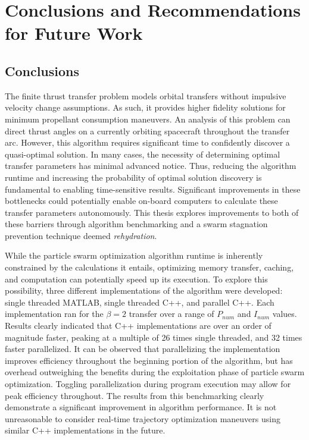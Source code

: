 \chapter{Conclusions and Recommendations for Future Work}

\section{Conclusions}
\noindent The finite thrust transfer problem models orbital transfers without
impulsive velocity change assumptions. As such, it provides higher fidelity
solutions for minimum propellant consumption maneuvers. An analysis of this problem
can direct thrust angles on a currently orbiting spacecraft throughout the transfer arc.
However, this algorithm requires significant time to confidently discover a quasi-optimal 
solution. In many cases, the necessity of determining optimal transfer parameters has minimal
advanced notice.
Thus, reducing the algorithm runtime and increasing the probability of optimal 
solution discovery is fundamental to enabling time-sensitive results. Significant improvements
in these bottlenecks could potentially enable on-board computers to calculate these transfer 
parameters autonomously. This thesis explores improvements to both of these barriers through algorithm 
benchmarking and a swarm stagnation prevention technique deemed \textit{rehydration}. \newline

\noindent While the particle swarm optimization algorithm runtime is inherently constrained by the 
calculations it entails, optimizing memory transfer, caching, and computation can potentially speed up its
execution. To explore this possibility, three different implementations of the algorithm were developed:
single threaded MATLAB, single threaded C++, and parallel C++. Each implementation ran for the $\beta = 2$
transfer over a range of $P_{num}$ and $I_{num}$ values. Results clearly indicated that C++ implementations 
are over an order of magnitude faster, peaking at a multiple of 26 times single threaded, and 32 times faster
parallelized. It can be observed that parallelizing the implementation improves efficiency throughout the
beginning portion of the algorithm, but has overhead outweighing the benefits during the exploitation phase of
particle swarm optimization. Toggling parallelization during program execution may allow for peak
efficiency throughout. The results from this benchmarking clearly demonstrate a significant improvement in 
algorithm performance. It is not unreasonable to consider real-time trajectory optimization maneuvers using 
similar C++ implementations in the future. \newline

